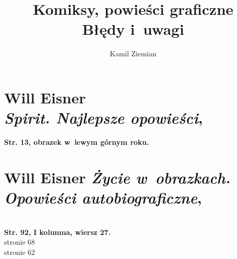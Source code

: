 \documentclass[a4paper,11pt]{article}
\title{Komiksy, powieści graficzne \\
  {\Large Błędy i~uwagi}}
\author{Kamil Ziemian}
\begin{document}





\maketitle %





\section{ %
  Will Eisner \\
  \textit{Spirit. Najlepsze opowieści},
  \parencite{Eisner-Spirit-Najlepsze-opowiesci-Pub-2009}}




\noindent
\textbf{Str. 13, obrazek w~lewym górnym roku.}












\section{Will Eisner \textit{Życie w~obrazkach. Opowieści
    autobiograficzne},
  \cite{EisnerZycieWObrazkach2009}}




\noindent \\
\textbf{Str. 92, I kolumna, wiersz 27.} \\
\Jest stronie 68 \\
\PowinnoByc stronie 62 \\













\printbibliography





\end{document}
